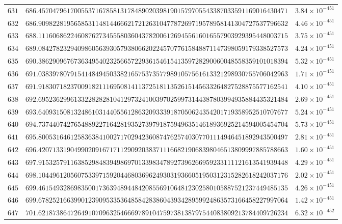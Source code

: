\documentclass[12pt,reqno]{amsart}
\theoremstyle{remark}
\begin{document}
\begin{longtable}{clc}
$631$ & $686.4570479617005537167858131784890203981901579705543387033591169016430471$ & $3.84\times 10^{-451}$ \\
$632$ & $686.9098228195658531148144666217212631047787269719578958141304727537796632$ & $4.46\times 10^{-451}$ \\
$633$ & $688.1116068622460876273455580360437820061269455616016557903929395448003715$ & $3.75\times 10^{-451}$ \\
$634$ & $689.0842782329409860563930579380662022457077615848871147398059179338527573$ & $4.24\times 10^{-451}$ \\
$635$ & $690.3862909676736349540232566572293615461541359728290060048558359101018394$ & $5.32\times 10^{-451}$ \\
$636$ & $691.0383978079154148494503382165753735779891057561613321298930755706042963$ & $1.71\times 10^{-451}$ \\
$637$ & $691.9183071823700918211169508141137251811352615145633264827528875577162541$ & $4.10\times 10^{-451}$ \\
$638$ & $692.6952362996133228282810412973241003970259973144387803994935884435321484$ & $2.69\times 10^{-451}$ \\
$639$ & $693.6409315081324861031440556128632093339187050624354201719358952510707677$ & $5.24\times 10^{-451}$ \\
$640$ & $694.7374407427654889227164281935273979187594963514618936925214594005454704$ & $5.73\times 10^{-451}$ \\
$641$ & $695.8005316461258363841002717029423608747625740307701114946451892943500497$ & $2.81\times 10^{-451}$ \\
$642$ & $696.4207133190499020916717112909203837111668219068398046513809997885788663$ & $1.60\times 10^{-451}$ \\
$643$ & $697.9153257911638529848394986970133983478927396266959233111121613541939448$ & $4.29\times 10^{-451}$ \\
$644$ & $698.1044961205607533971592044680369624930319366051950312315282618242037176$ & $2.02\times 10^{-451}$ \\
$645$ & $699.4615493286983500173639489448420855691064812302580105887521237449485135$ & $4.26\times 10^{-451}$ \\
$646$ & $699.6782521663990123909533536485842838604393428959924863573166458227997064$ & $1.42\times 10^{-451}$ \\
$647$ & $701.6218738647264910709632546669789104759738138797544083809213784409726234$ & $6.32\times 10^{-452}$ \\

\end{longtable}
\end{document}
